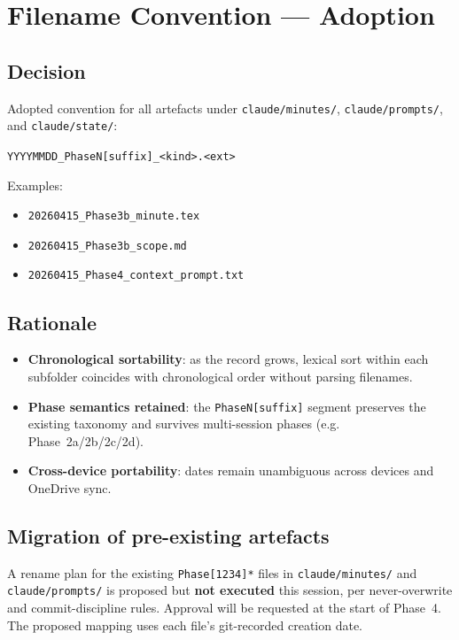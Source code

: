 \documentclass[11pt,a4paper]{article}
\begin{document}
\section{Filename Convention --- Adoption}
\label{sec:naming}

\subsection*{Decision}

Adopted convention for all artefacts under \texttt{claude/minutes/},
\texttt{claude/prompts/}, and \texttt{claude/state/}:

\begin{center}
\texttt{YYYYMMDD\_PhaseN[suffix]\_<kind>.<ext>}
\end{center}

Examples:
\begin{itemize}[nosep]
    \item \texttt{20260415\_Phase3b\_minute.tex}
    \item \texttt{20260415\_Phase3b\_scope.md}
    \item \texttt{20260415\_Phase4\_context\_prompt.txt}
\end{itemize}

\subsection*{Rationale}

\begin{itemize}[nosep]
    \item \textbf{Chronological sortability}: as the record grows, lexical sort within each subfolder coincides with chronological order without parsing filenames.
    \item \textbf{Phase semantics retained}: the \texttt{PhaseN[suffix]} segment preserves the existing taxonomy and survives multi-session phases (e.g. Phase~2a/2b/2c/2d).
    \item \textbf{Cross-device portability}: dates remain unambiguous across devices and OneDrive sync.
\end{itemize}

\subsection*{Migration of pre-existing artefacts}

A rename plan for the existing \texttt{Phase[1234]*} files in
\texttt{claude/minutes/} and \texttt{claude/prompts/} is proposed but
\textbf{not executed} this session, per never-overwrite and
commit-discipline rules. Approval will be requested at the start of
Phase~4. The proposed mapping uses each file's git-recorded creation
date.
\end{document}
